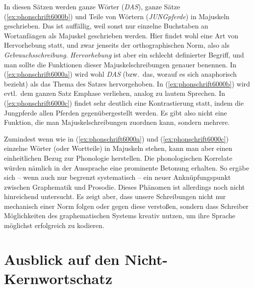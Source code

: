 In diesen Sätzen werden ganze Wörter (\textit{DAS}), ganze Sätze (\ref{ex:phonschrift6000b}) und Teile von Wörtern (\textit{JUNGpferde}) in Majuskeln geschrieben.
Das ist auffällig, weil sonst nur einzelne Buchstaben an Wortanfängen als Majuskel geschrieben werden.
Hier findet wohl eine Art von Hervorhebung statt, und zwar jenseits der orthographischen Norm, also als \textit{Gebrauchsschreibung}.
\textit{Hervorhebung} ist aber ein schlecht definierter Begriff, und man sollte die Funktionen dieser Majuskelschreibungen genauer benennen.
In (\ref{ex:phonschrift6000a}) wird wohl \textit{DAS} (bzw.\ das, worauf es sich anaphorisch bezieht) als das Thema des Satzes hervorgehoben.
In (\ref{ex:phonschrift6000b}) wird evtl.\ dem ganzen Satz Emphase verliehen, analog zu lautem Sprechen.
In (\ref{ex:phonschrift6000c}) findet sehr deutlich eine Kontrastierung statt, indem die Jungpferde allen Pferden gegenübergestellt werden.
Es gibt also nicht eine Funktion, die man Majuskelschreibungen zuordnen kann, sondern mehrere.

Zumindest wenn wie in (\ref{ex:phonschrift6000a}) und (\ref{ex:phonschrift6000c}) einzelne Wörter (oder Wortteile) in Majuskeln stehen, kann man aber einen einheitlichen Bezug zur Phonologie herstellen.
Die phonologischen Korrelate würden nämlich in der Aussprache eine prominente Betonung erhalten.
So ergäbe sich -- wenn auch nur begrenzt systematisch -- ein neuer Anknüpfungspunkt zwischen Graphematik und Prosodie.
Dieses Phänomen ist allerdings noch nicht hinreichend untersucht.
Es zeigt aber, dass unsere Schreibungen nicht nur mechanisch einer Norm folgen oder gegen diese verstoßen, sondern dass Schreiber Möglichkeiten des graphematischen Systems kreativ nutzen, um ihre Sprache möglichst erfolgreich zu kodieren.



\section{Ausblick auf den Nicht-Kernwortschatz}

\label{sec:nichtkernschreib}

